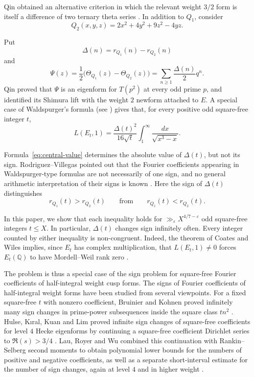 \documentclass[11pt]{amsart}
\theoremstyle{remark}
\newcommand{\Q}{\mathbb Q}
\begin{document}
Qin obtained an alternative criterion in which the relevant weight $3/2$
form is itself a difference of two ternary theta series \cite{Qin}. In
addition to $Q_1$, consider
\[
Q_2(x,y,z)=2x^2+4y^2+9z^2-4yz.
\]

Put
\[
\Delta(n)=r_{Q_1}(n)-r_{Q_2}(n)
\]
and
\[
\Psi(z)=\frac12\bigl(\Theta_{Q_1}(z)-\Theta_{Q_2}(z)\bigr)
=\sum_{n\geq1}\frac{\Delta(n)}2q^n.
\]
Qin proved that $\Psi$ is an eigenform for $T(p^2)$ at every odd prime
$p$, and identified its Shimura lift with the weight $2$ newform attached
to $E$. A special case of Waldspurger's formula (see \cite{Qin}) gives that,
for every positive odd square-free integer \(t\),
\begin{equation}\label{eq:central-value}
	L(E_t,1)=\frac{\Delta(t)^2}{16\sqrt{t}}
	\int_1^\infty\frac{dx}{\sqrt{x^3-x}}.
\end{equation}

Formula~\eqref{eq:central-value} determines the absolute value of
$\Delta(t)$, but not its sign. Rodriguez--Villegas pointed out that the Fourier coefficients appearing in Waldspurger-type formulas are not necessarily of one sign, and no general arithmetic interpretation of their signs is known \cite{RodriguezVillegas}. Here the sign of $\Delta(t)$ distinguishes
\[
r_{Q_1}(t)>r_{Q_2}(t)
\qquad\text{from}\qquad
r_{Q_1}(t)<r_{Q_2}(t).
\]

In this paper, we show that each inequality holds for $\gg_\varepsilon X^{4/7-\varepsilon}$ odd square-free integers $t\leq X$. In particular, $\Delta(t)$ changes sign infinitely often. Every integer counted by either inequality is non-congruent. Indeed, the theorem of Coates and Wiles implies, since $E_t$ has complex multiplication, that $L(E_t,1)\ne0$ forces $E_t(\Q)$ to have Mordell--Weil rank zero \cite{CoatesWiles}.

The problem is thus a special case of the sign problem for square-free
Fourier coefficients of half-integral weight cusp forms. The signs of Fourier coefficients of half-integral weight forms have
been studied from several viewpoints. For a fixed square-free $t$ with
nonzero coefficient, Bruinier and Kohnen proved infinitely many sign
changes in prime-power subsequences inside the square class $tn^2$
\cite{BruinierKohnen}. Hulse, K\i ral, Kuan and Lim proved infinite sign
changes of square-free coefficients for level $4$ Hecke eigenforms by
continuing a square-free coefficient Dirichlet series to
$\Re(s)>3/4$ \cite{HKKL}. Lau, Royer and Wu combined this continuation
with Rankin--Selberg second moments to obtain polynomial lower bounds for
the numbers of positive and negative coefficients, as well as a separate
short-interval estimate for the number of sign changes, again at level
$4$ and in higher weight \cite{LRW}.
\end{document}
